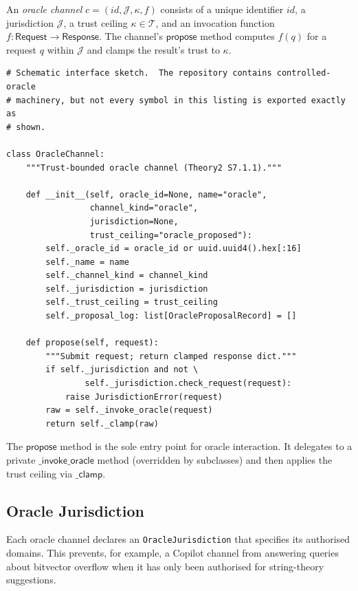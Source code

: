 \documentclass[11pt]{article}
\newcommand{\OJuris}{\texttt{OracleJurisdiction}}
\begin{document}
\begin{definition}\label{def:oracle-channel}
An \emph{oracle channel} $c = (id, \mathcal{J}, \kappa, f)$
consists of a unique identifier $id$, a jurisdiction $\mathcal{J}$,
a trust ceiling $\kappa \in \mathcal{T}$, and an invocation function
$f : \mathsf{Request} \to \mathsf{Response}$.  The channel's
$\mathsf{propose}$ method computes $f(q)$ for a request $q$ within
$\mathcal{J}$ and clamps the result's trust to $\kappa$.
\end{definition}

\begin{lstlisting}[style=jugeo-python,caption={Simplified channel sketch.}]
# Schematic interface sketch.  The repository contains controlled-oracle
# machinery, but not every symbol in this listing is exported exactly as
# shown.

class OracleChannel:
    """Trust-bounded oracle channel (Theory2 S7.1.1)."""

    def __init__(self, oracle_id=None, name="oracle",
                 channel_kind="oracle",
                 jurisdiction=None,
                 trust_ceiling="oracle_proposed"):
        self._oracle_id = oracle_id or uuid.uuid4().hex[:16]
        self._name = name
        self._channel_kind = channel_kind
        self._jurisdiction = jurisdiction
        self._trust_ceiling = trust_ceiling
        self._proposal_log: list[OracleProposalRecord] = []

    def propose(self, request):
        """Submit request; return clamped response dict."""
        if self._jurisdiction and not \
                self._jurisdiction.check_request(request):
            raise JurisdictionError(request)
        raw = self._invoke_oracle(request)
        return self._clamp(raw)
\end{lstlisting}

The $\mathsf{propose}$ method is the sole entry point for oracle
interaction.  It delegates to a private $\mathsf{\_invoke\_oracle}$
method (overridden by subclasses) and then applies the trust ceiling
via $\mathsf{\_clamp}$.

\subsection{Oracle Jurisdiction}\label{sec:jurisdiction}

Each oracle channel declares an \OJuris{} that specifies its
authorised domains.  This prevents, for example, a Copilot channel
from answering queries about bitvector overflow when it has only
been authorised for string-theory suggestions.
\end{document}
